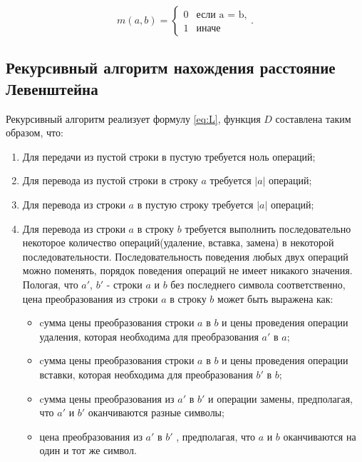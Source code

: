 \documentclass[a4paper,14pt, unknownkeysallowed]{bmstu}
\begin{document}
    \begin{equation}
        \label{eq:m}
        m(a, b) = \begin{cases}
        0 &\text{если a = b,}\\
        1 &\text{иначе}
        \end{cases}.
    \end{equation}

    \subsection{Рекурсивный алгоритм нахождения расстояние Левенштейна}

    Рекурсивный алгоритм реализует формулу \ref{eq:L}, функция $D$ составлена таким образом, что:
    \begin{enumerate}
        \item  Для передачи из пустой строки в пустую требуется ноль операций;
        \item Для перевода из пустой строки в строку $a$ требуется $|a|$ операций;
        \item Для перевода из строки $a$ в пустую строку требуется $|a|$ операций;
        \item Для перевода из строки $a$ в строку $b$ требуется выполнить последовательно некоторое количество операций(удаление, вставка, замена) в некоторой последовательности. Последовательность поведения любых двух операций можно поменять, порядок поведения операций не имеет никакого значения. Пологая, что $a'$, $b'$ - строки $a$ и $b$ без последнего символа соответственно, цена преобразования из строки $a$ в строку $b$ может быть выражена как:
        \begin{itemize}
    	\item cумма цены преобразования строки $a$ в $b$ и цены проведения операции удаления, которая необходима для преобразования $a'$ в $a$;
    	\item cумма цены преобразования строки $a$ в $b$ и цены проведения операции вставки, которая необходима для преобразования $b'$ в $b$;
    	\item cумма цены преобразования из $a'$ в $b'$ и операции замены, предполагая, что $a'$ и $b'$ оканчиваются разные символы;
    	\item цена преобразования из $a'$ в $b'$ , предполагая, что $a$ и $b$ оканчиваются на один и тот же символ.
	\end{itemize}
    \end{enumerate}
\end{document}
